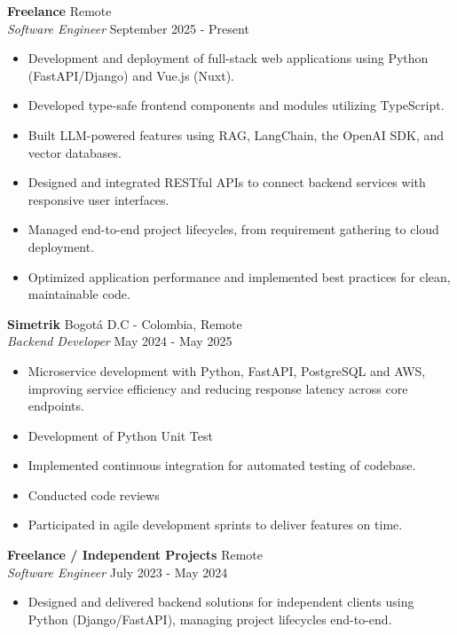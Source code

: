 \documentclass[a4paper]{article}
\begin{document}
\textbf{Freelance} \hfill Remote\\
\textit{Software Engineer} \hfill September 2025 - Present\\
\vspace{-2mm}
\begin{itemize} \itemsep 0pt
	\item Development and deployment of full-stack web applications using Python (FastAPI/Django) and Vue.js (Nuxt).
	\item Developed type-safe frontend components and modules utilizing TypeScript.
	\item Built LLM-powered features using RAG, LangChain, the OpenAI SDK, and vector databases.
	\item Designed and integrated RESTful APIs to connect backend services with responsive user interfaces.
	\item Managed end-to-end project lifecycles, from requirement gathering to cloud deployment.
	\item Optimized application performance and implemented best practices for clean, maintainable code.
\end{itemize}
\vspace*{-1mm}
\textbf{Simetrik} \hfill Bogotá D.C - Colombia, Remote\\
\textit{Backend Developer} \hfill May 2024 - May 2025\\
\vspace{-2mm}
\begin{itemize} \itemsep 0pt
	\item Microservice development with Python, FastAPI, PostgreSQL and AWS, improving service efficiency and reducing response latency across core endpoints.
	\item Development of Python Unit Test
	\item Implemented continuous integration for automated testing of codebase.
	\item Conducted code reviews
	\item Participated in agile development sprints to deliver features on time.
\end{itemize}
\textbf{Freelance / Independent Projects} \hfill Remote\\
\textit{Software Engineer} \hfill July 2023 - May 2024\\
\vspace{-2mm}
\begin{itemize} \itemsep 0pt
	\item Designed and delivered backend solutions for independent clients using Python (Django/FastAPI), managing project lifecycles end-to-end.
\end{itemize}
\end{document}
